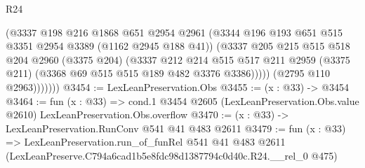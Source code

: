 \begin{lexlean}{R24}
\begin{coremodule}
                  (@3337
                    @198
                    @216
                    @1868
                    @651
                    @2954
                    @2961
                    (@3344 @196 @193 @651 @515 @3351 @2954 @3389 (@1162 @2945 @188 @41))
                    (@3337
                      @205
                      @215
                      @515
                      @518
                      @204
                      @2960
                      (@3375 @204)
                      (@3337
                        @212
                        @214
                        @515
                        @517
                        @211
                        @2959
                        (@3375 @211)
                        (@3368 @69 @515 @515 @189 @482 @3376 @3386)))))
                (@2795 @110 @2963)))))))
@3454 := LexLeanPreservation.Obs
@3455 := (x : @33) -> @3454
@3464 := fun (x : @33) =>
  cond.{1} @3454 @2605 (LexLeanPreservation.Obs.value @2610) LexLeanPreservation.Obs.overflow
@3470 := (x : @33) -> LexLeanPreservation.RunConv @541 @41 @483 @2611
@3479 := fun (x : @33) =>
  LexLeanPreservation.run_of_funRel
    @541
    @41
    @483
    @2611
    (LexLeanPreserve.C794a6cad1b5e8fdc98d1387794c0d40c.R24.__rel_0 @475)
\end{coremodule}
\end{lexlean}
